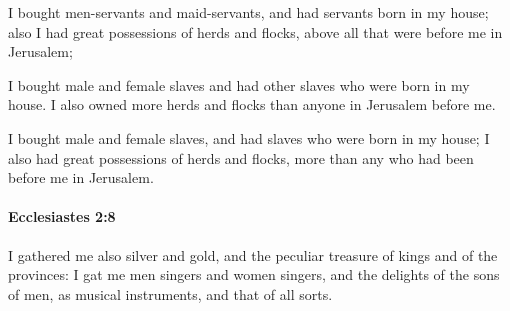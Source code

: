 			\begin{versebox}
					\item[BHS] 
					\item[LXX] 
					\item[ASV] I bought men-servants and maid-servants, and had servants born in my house; also I had great possessions of herds and flocks, above all that were before me in Jerusalem;
					\item[NIV] I bought male and female slaves and had other slaves who were born in my house. I also owned more herds and flocks than anyone in Jerusalem before me.
					\item[NRSV] I bought male and female slaves, and had slaves who were born in my house; I also had great possessions of herds and flocks, more than any who had been before me in Jerusalem.
			\end{versebox}

		\paragraph{Ecclesiastes 2:8} %
			\label{ECCLESIASTES-2-8}

			I gathered me also silver and gold, and the peculiar treasure of kings and of the provinces: I gat me men singers and women singers, and the delights of the sons of men, as musical instruments, and that of all sorts.

